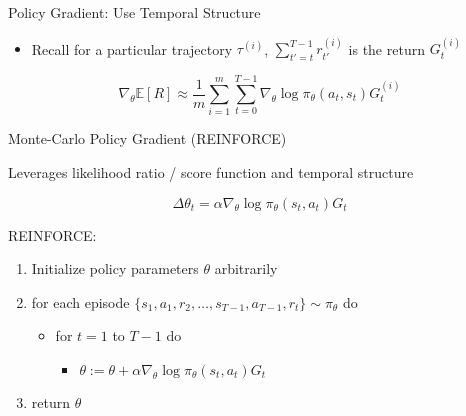 \begin{frame}[c]{Policy Gradient: Use Temporal Structure}
	
\begin{itemize}
	\item Recall for a particular trajectory $\tau^{(i)}$, $\sum_{t'=t}^{T-1} r_{t'}^{(i)}$ is the return $G_t^{(i)}$
\end{itemize}

$$\nabla_\theta \mathbb{E}[R] \approx \frac{1}{m} \sum_{i=1}^m \sum_{t=0}^{T-1} \nabla_\theta \log \pi_\theta (a_t,s_t) G_t^{(i)} $$
	
	
\end{frame}
\begin{frame}[c]{Monte-Carlo Policy Gradient (REINFORCE)}
	
Leverages likelihood ratio / score function and temporal structure

$$ \Delta \theta_t = \alpha \nabla_\theta \log \pi_\theta (s_t, a_t) G_t $$
	
	
REINFORCE:
\begin{enumerate}
	\item Initialize policy parameters $\theta$ arbitrarily
	\item for each episode $\{s_1, a_1, r_2, \ldots, s_{T-1}, a_{T-1}, r_t \} \sim \pi_\theta $ do
	\begin{itemize}
		\item for $t=1$ to $T - 1$ do
		\begin{itemize}
			\item $\theta := \theta + \alpha \nabla_\theta \log \pi_\theta (s_t, a_t) G_t $
		\end{itemize}
	\end{itemize}
	\item return $\theta$
\end{enumerate}

	
\end{frame}
